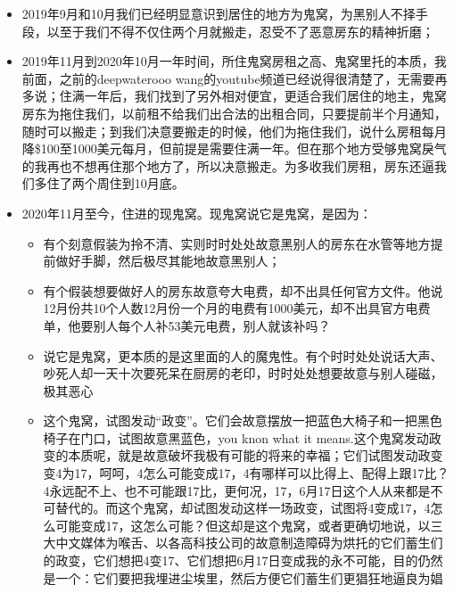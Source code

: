 \documentclass[9pt, b5paper]{article}
\begin{document}
\begin{enumerate}
\begin{enumerate}
\begin{itemize}
\item 2019年9月和10月我们已经明显意识到居住的地方为鬼窝，为黑别人不择手段，以至于我们不得不仅住两个月就搬走，忍受不了恶意房东的精神折磨；
\item 2019年11月到2020年10月一年时间，所住鬼窝房租之高、鬼窝里托的本质，我前面，之前的deepwaterooo wang的youtube频道已经说得很清楚了，无需要再多说；住满一年后，我们找到了另外相对便宜，更适合我们居住的地主，鬼窝房东为拖住我们，以前租不给我们出合法的出租合同，只要提前半个月通知，随时可以搬走；到我们决意要搬走的时候，他们为拖住我们，说什么房租每月降\$100至1000美元每月，但前提是需要住满一年。但在那个地方受够鬼窝戾气的我再也不想再住那个地方了，所以决意搬走。为多收我们房租，房东还逼我们多住了两个周住到10月底。
\item 2020年11月至今，住进的现鬼窝。现鬼窝说它是鬼窝，是因为：
\begin{itemize}
\item 有个刻意假装为拎不清、实则时时处处故意黑别人的房东在水管等地方提前做好手脚，然后极尽其能地故意黑别人；
\item 有个假装想要做好人的房东故意夸大电费，却不出具任何官方文件。他说12月份共10个人数12月份一个月的电费有1000美元，却不出具官方电费单，他要别人每个人补53美元电费，别人就该补吗？
\item 说它是鬼窝，更本质的是这里面的人的魔鬼性。有个时时处处说话大声、吵死人却一天十次要死呆在厨房的老印，时时处处想要故意与别人碰磁，极其恶心
\item 这个鬼窝，试图发动“政变”。它们会故意摆放一把蓝色大椅子和一把黑色椅子在门口，试图故意黑蓝色，you knon what it means.这个鬼窝发动政变的本质呢，就是故意破坏我极有可能的将来的幸福；它们试图发动政变变4为17，呵呵，4怎么可能变成17，4有哪样可以比得上、配得上跟17比？4永远配不上、也不可能跟17比，更何况，17，6月17日这个人从来都是不可替代的。而这个鬼窝，却试图发动这样一场政变，试图将4变成17，4怎么可能变成17，这怎么可能？但这却是这个鬼窝，或者更确切地说，以三大中文媒体为喉舌、以各高科技公司的故意制造障碍为烘托的它们蓄生们的政变，它们想把4变17、它们想把6月17日变成我的永不可能，目的仍然是一个：它们要把我埋进尘埃里，然后方便它们蓄生们更猖狂地逼良为娼
\end{itemize}
\end{itemize}
\end{enumerate}
\end{enumerate}
\end{document}
